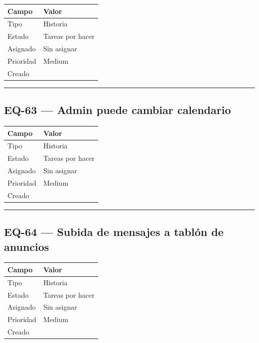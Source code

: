 \documentclass[
  spanish,
  11pt,
]{report}
\newcounter{none} %
\begin{document}
{\def\LTcaptype{none} %
\begin{longtable}[]{@{}ll@{}}
\toprule\noalign{}
Campo & Valor \\
\midrule\noalign{}
\endhead
\bottomrule\noalign{}
\endlastfoot
Tipo & Historia \\
Estado & Tareas por hacer \\
Asignado & Sin asignar \\
Prioridad & Medium \\
Creado & \\
\end{longtable}
}

\begin{center}\rule{0.5\linewidth}{0.5pt}\end{center}

\subsection{EQ-63 --- Admin puede cambiar
calendario}\label{eq-63-admin-puede-cambiar-calendario}

{\def\LTcaptype{none} %
\begin{longtable}[]{@{}ll@{}}
\toprule\noalign{}
Campo & Valor \\
\midrule\noalign{}
\endhead
\bottomrule\noalign{}
\endlastfoot
Tipo & Historia \\
Estado & Tareas por hacer \\
Asignado & Sin asignar \\
Prioridad & Medium \\
Creado & \\
\end{longtable}
}

\begin{center}\rule{0.5\linewidth}{0.5pt}\end{center}

\subsection{EQ-64 --- Subida de mensajes a tablón de
anuncios}\label{eq-64-subida-de-mensajes-a-tabluxf3n-de-anuncios}

{\def\LTcaptype{none} %
\begin{longtable}[]{@{}ll@{}}
\toprule\noalign{}
Campo & Valor \\
\midrule\noalign{}
\endhead
\bottomrule\noalign{}
\endlastfoot
Tipo & Historia \\
Estado & Tareas por hacer \\
Asignado & Sin asignar \\
Prioridad & Medium \\
Creado & \\
\end{longtable}
}
\end{document}
